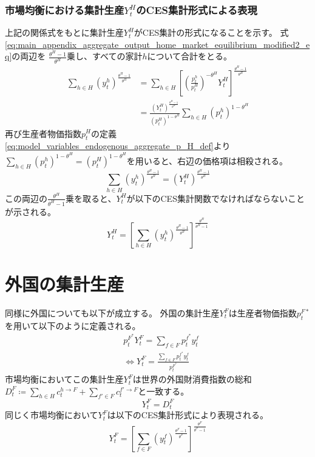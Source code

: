 \subsubsection*{市場均衡における集計生産\(Y_t^H\)のCES集計形式による表現}
\label{sec:main_appendix_aggregate_output_home_Y_H_ces}
上記の関係式をもとに集計生産\(Y_t^H\)がCES集計の形式になることを示す。
式\eqref{eq:main_appendix_aggregate_output_home_market_equilibrium_modified2_eq}の両辺を
\(\frac{\theta^H-1}{\theta^H}\)乗し、すべての家計\(h\)について合計をとる。
\begin{align}
\label{eq:main_appendix_aggregate_output_home_Y_H_ces_sum_y_h_eq}
    \sum_{h\in H}(y_t^h)^{\frac{\theta^H-1}{\theta^H}}&=\sum_{h\in H}\left[\left(\frac{p_t^h}{p_t^H}\right)^{-\theta^H}Y_t^H\right]^{\frac{\theta^H-1}{\theta^H}} \\
    &=\frac{(Y_t^H)^{\frac{\theta^H-1}{\theta^H}}}{(p_t^H)^{1-\theta^H}}\sum_{h\in H}(p_t^h)^{1-\theta^H} \nonumber
\end{align}
再び生産者物価指数\(p_t^H\)の定義\eqref{eq:model_variables_endogenous_aggregate_p_H_def}より
\(\sum_{h\in H}(p_t^h)^{1-\theta^H}=(p_t^H)^{1-\theta^H}\)を用いると、右辺の価格項は相殺される。
\begin{equation}
\label{eq:main_appendix_aggregate_output_home_Y_H_ces_sum_y_h_modified_eq}
    \sum_{h\in H}(y_t^h)^{\frac{\theta^H-1}{\theta^H}}=(Y_t^H)^{\frac{\theta^H-1}{\theta^H}}
\end{equation}
この両辺の\(\frac{\theta^H}{\theta^H-1}\)乗を取ると、\(Y_t^H\)が以下のCES集計関数でなければならないことが示される。
\begin{equation}
\label{eq:main_appendix_aggregate_output_home_Y_H_ces_Y_H_eq}
    Y_t^H=\left[\sum_{h\in H}(y_t^h)^{\frac{\theta^H-1}{\theta^H}}\right]^{\frac{\theta^H}{\theta^H-1}}
\end{equation}

\section{外国の集計生産}
\label{sec:main_appendix_aggregate_output_foreign}
同様に外国についても以下が成立する。
外国の集計生産\(Y_t^F\)は生産者物価指数\(p_t^{F*}\)を用いて以下のように定義される。
\begin{align}
\label{eq:main_appendix_aggregate_output_foreign_Y_F_def}
    &p_t^{F^*}Y_t^F=\sum_{f\in F}p_t^{f^*}y_t^f\\
    &\Leftrightarrow Y_t^F=\frac{\sum_{f\in F}p_t^{f^*}y_t^f}{p_t^{F^*}}
\end{align}
市場均衡においてこの集計生産\(Y_t^F\)は世界の外国財消費指数の総和\(D_t^F\coloneqq\sum_{h\in H}c_t^{h\to F}+\sum_{f'\in F}c_t^{f'\to F}\)と一致する。
\begin{equation}
\label{eq:main_appendix_aggregate_output_foreign_Y_F_D_F_eq}
    Y_t^F=D_t^F
\end{equation}
同じく市場均衡において\(Y_t^F\)は以下のCES集計形式により表現される。
\begin{equation}
\label{eq:main_appendix_aggregate_output_foreign_Y_F_ces_Y_F_eq}
    Y_t^F=\left[\sum_{f\in F}(y_t^f)^{\frac{\theta^F-1}{\theta^F}}\right]^{\frac{\theta^F}{\theta^F-1}}
\end{equation}
